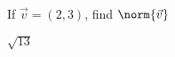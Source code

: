 
\begin{Exercise}[
name={},
title={}, 
difficulty=0,
origin={\cite{SM}}]
If $\vec{v} = (2,3)$, find $\norm{\vec{v}}$
\end{Exercise}

\begin{Answer}
$\sqrt{13}$
\end{Answer}
